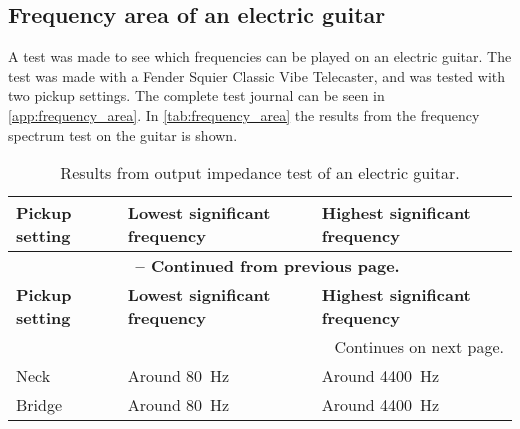 \subsection{Frequency area of an electric guitar}
A test was made to see which frequencies can be played on an electric guitar. The test was made with a Fender Squier Classic Vibe Telecaster, and was tested with two pickup settings. The complete test journal can be seen in \autoref{app:frequency_area}. In \autoref{tab:frequency_area} the results from the frequency spectrum test on the guitar is shown.

\begin{longtable}[h!]{ |m{}| 
          m{}| 
          m{}|   } 
\caption{Results from output impedance test of an electric guitar.} \label{tab:frequency_area} \\ 
 
\hline 
\textbf{Pickup setting} & \textbf{Lowest significant frequency} & \textbf{Highest significant frequency} \\ 
\hline 
\endfirsthead     
\multicolumn{3}{c}{{{\footnotesize \bfseries \tablename\ \thetable{} -- Continued from previous page.}}} \\  
\hline 
\textbf{Pickup setting} & \textbf{Lowest significant frequency} & \textbf{Highest significant frequency} \\ 
\hline 
\endhead       
\hline \multicolumn{3}{|r|}{{Continues on next page.}} \\ \hline 
\endfoot     
\hline 
\endlastfoot 
Neck & Around \SI{80}{\hertz} & Around \SI{4400}{\hertz} \\ \hline
Bridge & Around \SI{80}{\hertz}  & Around \SI{4400}{\hertz}\\ \hline
\end{longtable}

